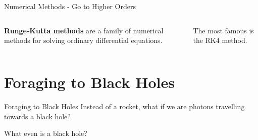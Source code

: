 \documentclass{beamer}
\begin{document}
\begin{frame}{Numerical Methods - Go to Higher Orders}
\begin{columns}
        \vspace{0.5cm}

        \textbf{Runge-Kutta methods} are a family of numerical methods for solving ordinary differential equations.

        \vspace{0.5cm}

        The most famous is the RK4 method.
    \end{columns}

\end{frame}


\section{Foraging to Black Holes}


\begin{frame}{Foraging to Black Holes}
    Instead of a rocket, what if we are photons travelling towards a black hole?

    \vspace{0.5cm}

    \begin{center}
        {\Large What even is a black hole?}
    \end{center}
\end{frame}
\end{document}
